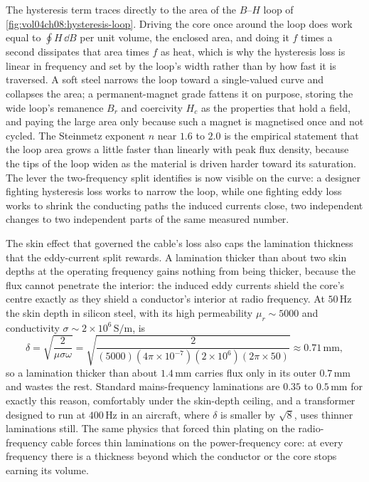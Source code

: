 The hysteresis term traces directly to the area of the $B$--$H$ loop of
\cref{fig:vol04ch08:hysteresis-loop}. Driving the core once around the loop
does work equal to $\oint H\,\dd B$ per unit volume, the enclosed area, and
doing it $f$ times a second dissipates that area times $f$ as heat, which is
why the hysteresis loss is linear in frequency and set by the loop's width
rather than by how fast it is traversed. A soft steel narrows the loop
toward a single-valued curve and collapses the area; a permanent-magnet
grade fattens it on purpose, storing the wide loop's remanence $B_r$ and
coercivity $H_c$ as the properties that hold a field, and paying the large
area only because such a magnet is magnetised once and not cycled. The
Steinmetz exponent $n$ near $1.6$ to $2.0$ is the empirical statement that
the loop area grows a little faster than linearly with peak flux density,
because the tips of the loop widen as the material is driven harder toward
its saturation. The lever the two-frequency split identifies is now visible
on the curve: a designer fighting hysteresis loss works to narrow the loop,
while one fighting eddy loss works to shrink the conducting paths the
induced currents close, two independent changes to two independent parts of
the same measured number.



\begin{mastery}
The skin effect that governed the cable's loss also caps the lamination
thickness that the eddy-current split rewards. A lamination thicker than
about two skin depths at the operating frequency gains nothing from
being thicker, because the flux cannot penetrate the interior: the
induced eddy currents shield the core's centre exactly as they shield a
conductor's interior at radio frequency. At $50\,\si{\hertz}$ the skin
depth in silicon steel, with its high permeability $\mu_r\sim 5000$ and
conductivity $\sigma\sim 2\times 10^{6}\,\si{\siemens\per\meter}$, is
\[
\delta = \sqrt{\frac{2}{\mu\sigma\omega}} = \sqrt{\frac{2}{(5000)(4\pi
\times 10^{-7})(2\times 10^{6})(2\pi\times 50)}} \approx 0.71\,\si{\milli
\meter},
\]
so a lamination thicker than about $1.4\,\si{\milli\meter}$ carries flux
only in its outer $0.7\,\si{\milli\meter}$ and wastes the rest. Standard
mains-frequency laminations are $0.35$ to $0.5\,\si{\milli\meter}$ for
exactly this reason, comfortably under the skin-depth ceiling, and a
transformer designed to run at $400\,\si{\hertz}$ in an aircraft, where
$\delta$ is smaller by $\sqrt{8}$, uses thinner laminations still. The
same physics that forced thin plating on the radio-frequency cable
forces thin laminations on the power-frequency core: at every frequency
there is a thickness beyond which the conductor or the core stops
earning its volume.
\end{mastery}

